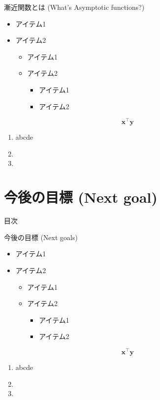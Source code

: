 \documentclass[aspectratio=169, dvipdfmx, 11pt]{beamer} %
\begin{document}
\begin{frame}{漸近関数とは (What's Asymptotic functions?) }
    \begin{itemize}
    \item アイテム1
    \item \alert{アイテム2}
        \begin{itemize}
        \item アイテム1
        \item \alert{アイテム2}
            \begin{itemize}
            \item アイテム1
            \item \alert{アイテム2}
            \end{itemize}
        \end{itemize}
    \end{itemize}
    \[
    \bm{x}^\top\bm{y}
    \]
    \begin{enumerate}
    \item abcde
    \item {}
    \item
    \end{enumerate}
\end{frame}

\section{今後の目標 (Next goal) }
\begin{frame}{目次}
    \tableofcontents[currentsection]
\end{frame}

\begin{frame}{今後の目標 (Next goals) }
    \begin{itemize}
    \item アイテム1
    \item \alert{アイテム2}
        \begin{itemize}
        \item アイテム1
        \item \alert{アイテム2}
            \begin{itemize}
            \item アイテム1
            \item \alert{アイテム2}
            \end{itemize}
        \end{itemize}
    \end{itemize}
    \[
    \bm{x}^\top\bm{y}
    \]
    \begin{enumerate}
    \item abcde
    \item {}
    \item
    \end{enumerate}
\end{frame}
\end{document}
